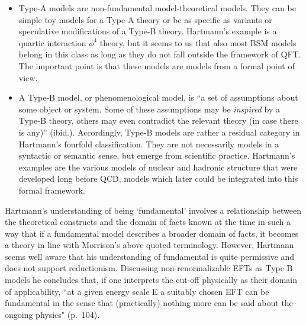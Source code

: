 \begin{itemize}
\item Type-A models are non-fundamental model-theoretical models. They can be simple toy models for a Type-A theory or be as specific as variants or speculative modifications of a Type-B theory. 
Hartmann's example is a quartic interaction $\phi^4$ theory, but it seems to us that also most BSM models belong in this class as long as they do not fall outside the framework of QFT. 
The important point is that these models are models from a formal point of view. 

\item A Type-B model, or phenomenological model, is ``a set of assumptions about some object or system. Some of these assumptions may be \emph{inspired} by a Type-B theory, others may even contradict the relevant theory (in case there is any)'' (ibid.). Accordingly, Type-B models are rather a residual category in Hartmann's fourfold classification. 
They are not necessarily models in a syntactic or semantic sense, but emerge from scientific practice. 
Hartmann's examples are the various models of nuclear and hadronic structure that were developed long before QCD, models which later could be integrated into this formal framework. 
\end{itemize}

Hartmann's understanding of being `fundamental' involves a relationship between the theoretical constructs and the domain of facts known at the time in such a way that if a fundamental model describes a broader domain of facts, it becomes a theory in line with Morrison's above quoted terminology. However, Hartmann seems well aware that his understanding of fundamental is quite permissive and does not support reductionism. Discussing non-renormalizable EFTs as Type B models he concludes that, if one interprets the cut-off physically as their domain of applicability, ``at a given energy scale E a suitably chosen EFT can be fundamental in the sense that (practically) nothing more can be said about the ongoing physics" (p.~104).

